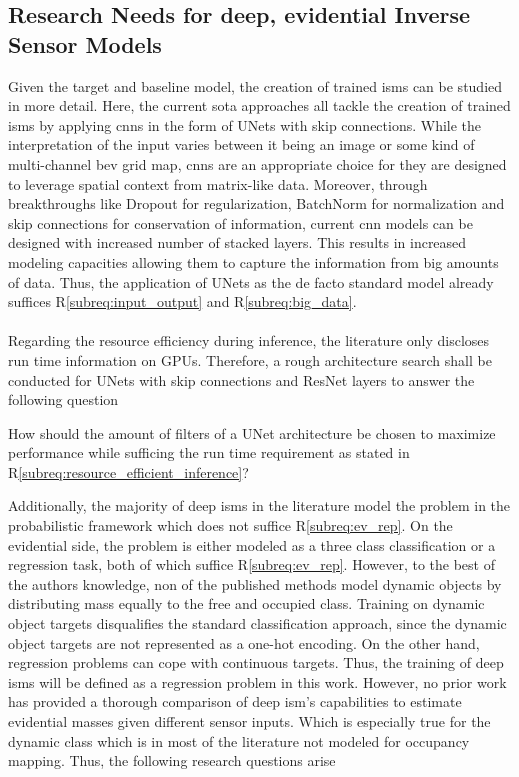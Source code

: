 \subsection{Research Needs for deep, evidential Inverse Sensor Models}
\label{subsec:research_needs_for_deep_isms}
Given the target and baseline model, the creation of trained \gls{ism}s can be studied in more detail. Here, the current \gls{sota} approaches all tackle the creation of trained \gls{ism}s by applying \gls{cnn}s in the form of UNets with skip connections. While the interpretation of the input varies between it being an image or some kind of multi-channel \gls{bev} grid map, \gls{cnn}s are an appropriate choice for they are designed to leverage spatial context from matrix-like data. Moreover, through breakthroughs like Dropout for regularization, BatchNorm for normalization and skip connections for conservation of information, current \gls{cnn} models can be designed with increased number of stacked layers. This results in increased modeling capacities allowing them to capture the information from big amounts of data. Thus, the application of UNets as the de facto standard model already suffices R\ref{subreq:input_output} and R\ref{subreq:big_data}.
\\\\
Regarding the resource efficiency during inference, the literature only discloses run time information on GPUs. Therefore, a rough architecture search shall be conducted for UNets with skip connections and ResNet layers to answer the following question
\\
\begin{requ} \label{requ:network_search}
	How should the amount of filters of a UNet architecture be chosen to maximize performance while sufficing the run time requirement as stated in R\ref{subreq:resource_efficient_inference}?
\end{requ}
Additionally, the majority of deep \gls{ism}s in the literature model the problem in the probabilistic framework which does not suffice R\ref{subreq:ev_rep}. On the evidential side, the problem is either modeled as a three class classification or a regression task, both of which suffice R\ref{subreq:ev_rep}. However, to the best of the authors knowledge, non of the published methods model dynamic objects by distributing mass equally to the free and occupied class. Training on dynamic object targets disqualifies the standard classification approach, since the dynamic object targets are not represented as a one-hot encoding. On the other hand, regression problems can cope with continuous targets. Thus, the training of deep \gls{ism}s will be defined as a regression problem in this work. However, no prior work has provided a thorough comparison of deep \gls{ism}'s capabilities to estimate evidential masses given different sensor inputs. Which is especially true for the dynamic class which is in most of the literature not modeled for occupancy mapping. Thus, the following research questions arise
